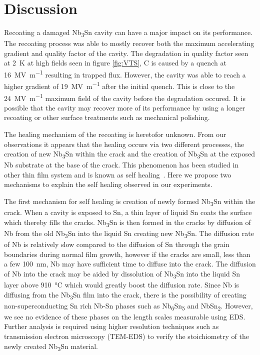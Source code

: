 \section*{Discussion}
\label{sec:Discussion}

Recoating a damaged Nb\textsubscript{3}Sn cavity can have a major impact on its performance. The recoating process was able to mostly recover both the maximum accelerating gradient and quality factor of the cavity. The degradation in quality factor seen at \qty{2}{\kelvin} at high fields seen in figure \ref{fig:VTS}, C is caused by a quench at \qty{16}{\mega\volt\per\meter} resulting in trapped flux. However, the cavity was able to reach a higher gradient of \qty{19}{\mega\volt\per\meter} after the initial quench. This is close to the \qty{24}{\mega\volt\per\meter} maximum field of the cavity before the degradation occured. It is possible that the cavity may recover more of its performance by using a longer recoating or other surface treatments such as mechanical polishing\cite{viklund2024improving}. 

The healing mechanism of the recoating is heretofor unknown. From our observations it appears that the healing occurs via two different processes, the creation of new Nb\textsubscript{3}Sn within the crack and the creation of Nb\textsubscript{3}Sn at the exposed Nb substrate at the base of the crack. This phenomenon has been studied in other thin film system and is known as self healing~\cite{Sloof2007}. Here we propose two mechanisms to explain the self healing observed in our experiments. 

The first mechanism for self healing is creation of newly formed Nb\textsubscript{3}Sn within the crack. When a cavity is exposed to Sn, a thin layer of liquid Sn coats the surface which thereby fills the cracks. Nb\textsubscript{3}Sn is then formed in the cracks by diffusion of Nb from the old Nb\textsubscript{3}Sn into the liquid Sn creating new Nb\textsubscript{3}Sn. The diffusion rate of Nb is relatively slow compared to the diffusion of Sn through the grain boundaries during normal film growth, however if the cracks are small, less than a few \qty{100}{nm}, Nb may have sufficient time to diffuse into the crack. The diffusion of Nb into the crack may be aided by dissolution of Nb\textsubscript{3}Sn into the liquid Sn layer above \qty{910}{\celsius} which would greatly boost the diffusion rate. Since Nb is diffusing from the Nb\textsubscript{3}Sn film into the crack, there is the possibility of creating non-superconducting Sn rich Nb-Sn phases such as Nb\textsubscript{6}Sn\textsubscript{5} and NbSn\textsubscript{2}. However, we see no evidence of these phases on the length scales measurable using EDS. Further analysis is required using higher resolution techniques such as transmission electron microscopy (TEM-EDS) to verify the stoichiometry of the newly created Nb\textsubscript{3}Sn material.

